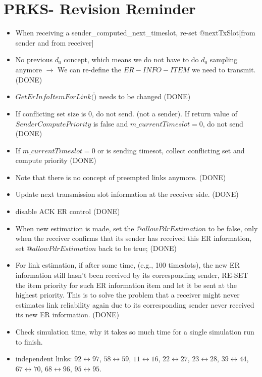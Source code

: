 \section {PRKS- Revision Reminder}
\begin{itemize}
  \item When receiving a sender\_computed\_next\_timeslot, re-set @nextTxSlot[from sender and from receiver]

  \item No previous $d_0$ concept, which means we do not have to do $d_0$ sampling anymore $\rightarrow$ We can re-define the $ER-INFO-ITEM$ we need to transmit.(DONE)
  \item $GetErInfoItemForLink (\dot)$ needs to be changed (DONE)
  \item If conflicting set size is 0, do not send. (not a sender). If return value of $SenderComputePriority$ is false and $m\_currentTimeslot = 0$, do not send (DONE)
  \item If $m\_currentTimeslot = 0$ or is sending timesot, collect conflicting set and compute priority (DONE)
  \item Note that there is no concept of preempted links anymore. (DONE)
  \item Update next transmission slot information at the receiver side. (DONE)
  \item disable ACK ER control (DONE)
  \item When new estimation is made, set the $@allowPdrEstimation$ to be false, only when the receiver confirms that its sender has received this ER information, set $@allowPdrEstimation$ back to be true; (DONE)
  \item For link estimation, if after some time, (e.g., 100 timeslots), the new ER information still hasn't been received by its corresponding sender, RE-SET the item priority for such ER information item and let it be sent at the highest priority. This is to solve the problem that a receiver might never estimates link reliability again due to its corresponding sender never received its new ER information. (DONE)
  \item Check simulation time, why it takes so much time for a single simulation run to finish.
  \item independent links: $92 \leftrightarrow 97$, $58 \leftrightarrow 59$, $11 \leftrightarrow 16$, $22 \leftrightarrow 27$, $23 \leftrightarrow 28$, $39 \leftrightarrow 44$, $67 \leftrightarrow 70$, $68 \leftrightarrow 96$, $95 \leftrightarrow 95$.
\end{itemize}
